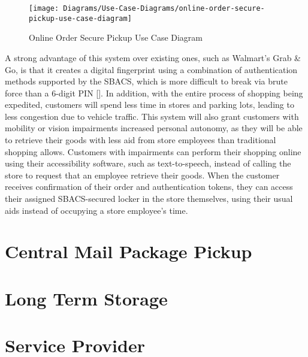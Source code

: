 \documentclass[12pt]{report}
\begin{document}
\begin{figure}
	\texttt{[image: Diagrams/Use-Case-Diagrams/online-order-secure-pickup-use-case-diagram]}
	\caption{Online Order Secure Pickup Use Case Diagram}
	\label{fig:online-order-secure-pickup-use-case}
\end{figure}

A strong advantage of this system over existing ones, such as Walmart's Grab \& Go, is that it creates a digital 
fingerprint using a combination of authentication methods supported by the SBACS, which is more difficult to 
break via brute force than a 6-digit PIN []. In addition, with the entire process of shopping being 
expedited, customers will spend less time in stores and parking lots, leading to less congestion due to vehicle 
traffic. This system will also grant customers with mobility or vision impairments increased personal autonomy, as 
they will be able to retrieve their goods with less aid from store employees than traditional shopping allows. Customers
with impairments can perform their shopping online using their accessibility software, such as text-to-speech, instead 
of calling the store to request that an employee retrieve their goods. When the customer receives confirmation of their 
order and authentication tokens, they can access their assigned SBACS-secured locker in the store themselves, using 
their usual aids instead of occupying a store employee's time.


\section{Central Mail Package Pickup}


\section{Long Term Storage}


\section{Service Provider}

\end{document}
